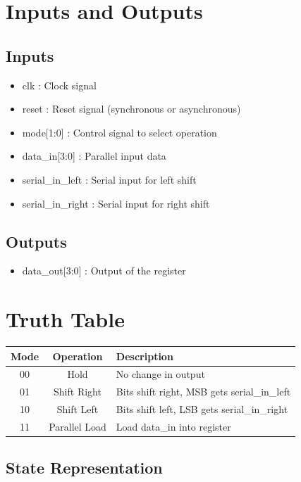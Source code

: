 \documentclass[12pt]{article}
\begin{document}
\section{Inputs and Outputs}

\subsection{Inputs}
\begin{itemize}
    \item clk : Clock signal
    \item reset : Reset signal (synchronous or asynchronous)
    \item mode[1:0] : Control signal to select operation
    \item data\_in[3:0] : Parallel input data
    \item serial\_in\_left : Serial input for left shift
    \item serial\_in\_right : Serial input for right shift
\end{itemize}

\subsection{Outputs}
\begin{itemize}
    \item data\_out[3:0] : Output of the register
\end{itemize}

\section{Truth Table}

\begin{center}
\begin{tabular}{|c|c|l|}
\hline
Mode & Operation & Description \\
\hline
00 & Hold & No change in output \\
01 & Shift Right & Bits shift right, MSB gets serial\_in\_left \\
10 & Shift Left & Bits shift left, LSB gets serial\_in\_right \\
11 & Parallel Load & Load data\_in into register \\
\hline
\end{tabular}
\end{center}

\subsection{State Representation}
\end{document}
